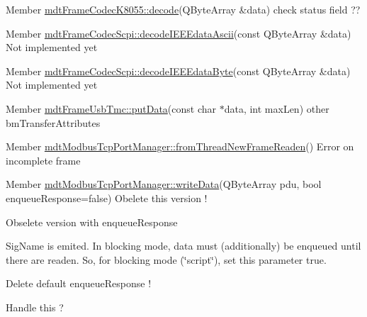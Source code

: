 \label{todo__todo000057}
\hypertarget{todo__todo000057}{}
 
\begin{DoxyDescription}
\item[Member \hyperlink{classmdt_frame_codec_k8055_a9dfe60529b0e80d5bbd3852fdea51b18}{mdtFrameCodecK8055::decode}(QByteArray \&data) ]check status field ?? 
\end{DoxyDescription}

\label{todo__todo000058}
\hypertarget{todo__todo000058}{}
 
\begin{DoxyDescription}
\item[Member \hyperlink{classmdt_frame_codec_scpi_aa6596dc898438be704191ad282d02100}{mdtFrameCodecScpi::decodeIEEEdataAscii}(const QByteArray \&data) ]Not implemented yet 
\end{DoxyDescription}

\label{todo__todo000059}
\hypertarget{todo__todo000059}{}
 
\begin{DoxyDescription}
\item[Member \hyperlink{classmdt_frame_codec_scpi_ab70c6c3d2d91ddff065952b6c2db8345}{mdtFrameCodecScpi::decodeIEEEdataByte}(const QByteArray \&data) ]Not implemented yet 
\end{DoxyDescription}

\label{todo__todo000060}
\hypertarget{todo__todo000060}{}
 
\begin{DoxyDescription}
\item[Member \hyperlink{classmdt_frame_usb_tmc_a06d2743a113bd2b4cf2ee44014ecd710}{mdtFrameUsbTmc::putData}(const char $\ast$data, int maxLen) ]other bmTransferAttributes 
\end{DoxyDescription}

\label{todo__todo000021}
\hypertarget{todo__todo000021}{}
 
\begin{DoxyDescription}
\item[Member \hyperlink{classmdt_modbus_tcp_port_manager_ad941ea607f00db54aa6deb2866a539e9}{mdtModbusTcpPortManager::fromThreadNewFrameReaden}() ]Error on incomplete frame 
\end{DoxyDescription}

\label{todo__todo000022}
\hypertarget{todo__todo000022}{}
 
\begin{DoxyDescription}
\item[Member \hyperlink{classmdt_modbus_tcp_port_manager_ac83ea9c640869a4bccb4a4787697c646}{mdtModbusTcpPortManager::writeData}(QByteArray pdu, bool enqueueResponse=false) ]Obelete this version ! 

Obselete version with enqueueResponse 

SigName is emited. In blocking mode, data must (additionally) be enqueued until there are readen. So, for blocking mode (\char`\"{}script\char`\"{}), set this parameter true. 

Delete default enqueueResponse ! 

Handle this ? 
\end{DoxyDescription}

